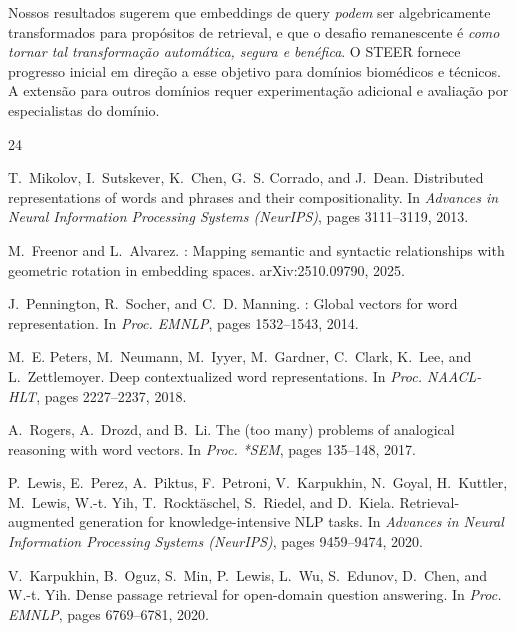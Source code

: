 \documentclass{article}
\begin{document}
Nossos resultados sugerem que embeddings de query \emph{podem} ser algebricamente transformados para propósitos de retrieval, e que o desafio remanescente é \emph{como tornar tal transformação automática, segura e benéfica}. O STEER fornece progresso inicial em direção a esse objetivo para domínios biomédicos e técnicos. A extensão para outros domínios requer experimentação adicional e avaliação por especialistas do domínio.



\begin{thebibliography}{24}

T.~Mikolov, I.~Sutskever, K.~Chen, G.~S. Corrado, and J.~Dean.
\newblock Distributed representations of words and phrases and their compositionality.
\newblock In \emph{Advances in Neural Information Processing Systems (NeurIPS)}, pages 3111--3119, 2013.

M.~Freenor and L.~Alvarez.
: Mapping semantic and syntactic relationships with geometric rotation in embedding spaces.
\newblock arXiv:2510.09790, 2025.

J.~Pennington, R.~Socher, and C.~D. Manning.
: Global vectors for word representation.
\newblock In \emph{Proc. EMNLP}, pages 1532--1543, 2014.

M.~E. Peters, M.~Neumann, M.~Iyyer, M.~Gardner, C.~Clark, K.~Lee, and L.~Zettlemoyer.
\newblock Deep contextualized word representations.
\newblock In \emph{Proc. NAACL-HLT}, pages 2227--2237, 2018.

A.~Rogers, A.~Drozd, and B.~Li.
\newblock The (too many) problems of analogical reasoning with word vectors.
\newblock In \emph{Proc. *SEM}, pages 135--148, 2017.

P.~Lewis, E.~Perez, A.~Piktus, F.~Petroni, V.~Karpukhin, N.~Goyal, H.~Kuttler, M.~Lewis, W.-t. Yih, T.~Rockt\"{a}schel, S.~Riedel, and D.~Kiela.
\newblock Retrieval-augmented generation for knowledge-intensive {NLP} tasks.
\newblock In \emph{Advances in Neural Information Processing Systems (NeurIPS)}, pages 9459--9474, 2020.

V.~Karpukhin, B.~Oguz, S.~Min, P.~Lewis, L.~Wu, S.~Edunov, D.~Chen, and W.-t. Yih.
\newblock Dense passage retrieval for open-domain question answering.
\newblock In \emph{Proc. EMNLP}, pages 6769--6781, 2020.


\end{thebibliography}
\end{document}
